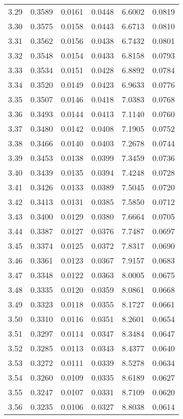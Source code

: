 \documentclass{article}
\begin{document}
\begin{longtable}{cccccc}
3.29 & 0.3589 & 0.0161 & 0.0448 & 6.6002 & 0.0819 \\
3.30 & 0.3575 & 0.0158 & 0.0443 & 6.6713 & 0.0810 \\
3.31 & 0.3562 & 0.0156 & 0.0438 & 6.7432 & 0.0801 \\
3.32 & 0.3548 & 0.0154 & 0.0433 & 6.8158 & 0.0793 \\
3.33 & 0.3534 & 0.0151 & 0.0428 & 6.8892 & 0.0784 \\
3.34 & 0.3520 & 0.0149 & 0.0423 & 6.9633 & 0.0776 \\
3.35 & 0.3507 & 0.0146 & 0.0418 & 7.0383 & 0.0768 \\
3.36 & 0.3493 & 0.0144 & 0.0413 & 7.1140 & 0.0760 \\
3.37 & 0.3480 & 0.0142 & 0.0408 & 7.1905 & 0.0752 \\
3.38 & 0.3466 & 0.0140 & 0.0403 & 7.2678 & 0.0744 \\
3.39 & 0.3453 & 0.0138 & 0.0399 & 7.3459 & 0.0736 \\
3.40 & 0.3439 & 0.0135 & 0.0394 & 7.4248 & 0.0728 \\
3.41 & 0.3426 & 0.0133 & 0.0389 & 7.5045 & 0.0720 \\
3.42 & 0.3413 & 0.0131 & 0.0385 & 7.5850 & 0.0712 \\
3.43 & 0.3400 & 0.0129 & 0.0380 & 7.6664 & 0.0705 \\
3.44 & 0.3387 & 0.0127 & 0.0376 & 7.7487 & 0.0697 \\
3.45 & 0.3374 & 0.0125 & 0.0372 & 7.8317 & 0.0690 \\
3.46 & 0.3361 & 0.0123 & 0.0367 & 7.9157 & 0.0683 \\
3.47 & 0.3348 & 0.0122 & 0.0363 & 8.0005 & 0.0675 \\
3.48 & 0.3335 & 0.0120 & 0.0359 & 8.0861 & 0.0668 \\
3.49 & 0.3323 & 0.0118 & 0.0355 & 8.1727 & 0.0661 \\
3.50 & 0.3310 & 0.0116 & 0.0351 & 8.2601 & 0.0654 \\
3.51 & 0.3297 & 0.0114 & 0.0347 & 8.3484 & 0.0647 \\
3.52 & 0.3285 & 0.0113 & 0.0343 & 8.4377 & 0.0640 \\
3.53 & 0.3272 & 0.0111 & 0.0339 & 8.5278 & 0.0634 \\
3.54 & 0.3260 & 0.0109 & 0.0335 & 8.6189 & 0.0627 \\
3.55 & 0.3247 & 0.0107 & 0.0331 & 8.7109 & 0.0620 \\
3.56 & 0.3235 & 0.0106 & 0.0327 & 8.8038 & 0.0614 \\

\end{longtable}
\end{document}
